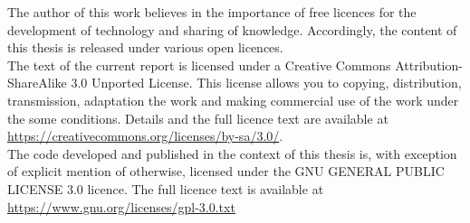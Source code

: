 The author of this work believes in the importance of free licences for the development of technology and sharing of knowledge.
Accordingly, the content of this thesis is released under various open licences.\\

The text of the current report is licensed under a Creative Commons Attribution-ShareAlike 3.0 Unported License.
This license allows you to copying, distribution, transmission, adaptation the work and making commercial use of the work under the some conditions.
Details and the full licence text are available at \url{https://creativecommons.org/licenses/by-sa/3.0/}.\\

The code developed and published in the context of this thesis is, with exception of explicit mention of otherwise, licensed under the GNU GENERAL PUBLIC LICENSE 3.0 licence. The full licence text is available at \url{https://www.gnu.org/licenses/gpl-3.0.txt}

